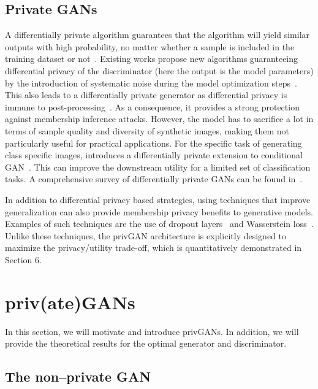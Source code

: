 \documentclass{article}
\begin{document}
\subsection{Private GANs}
A differentially private algorithm guarantees that the algorithm will yield similar outputs with high probability, no matter whether a sample is included in the training dataset or not~\cite{dwork2014algorithmic}. Existing works  \cite{xie2018differentially,jordon2018pate} propose new algorithms guaranteeing differential privacy of the discriminator (here the output is the model parameters) by the introduction of systematic noise during the model optimization steps~\cite{abadi2016deep}. This also leads to a differentially private generator as differential privacy is immune to post-processing~\cite{dwork2014algorithmic}. As a consequence, it provides a strong protection against membership inference attacks. However, the model has to sacrifice a lot in terms of sample quality and diversity of synthetic images, making them not particularly useful for practical applications. For the specific task of generating class specific images, \cite{torkzadehmahani2019dp} introduces a differentially private extension to conditional GAN~\cite{mirza2014conditional}. This can improve the downstream utility for a limited set of classification tasks. A comprehensive survey of differentially private GANs can be found in~\cite{fan2020survey}.

In addition to differential privacy based strategies, using techniques that improve generalization can also provide membership privacy benefits to generative models. Examples of such techniques are the use of dropout layers~\cite{mou2018dropout} and Wasserstein loss~\cite{arjovsky2017wasserstein}. Unlike these techniques, the privGAN architecture is explicitly designed to maximize the privacy/utility trade-off, which is quantitatively demonstrated in Section 6. 

\section{priv(ate)GANs}
In this section, we will motivate and introduce privGANs. In addition, we will provide the theoretical results for the optimal generator and discriminator.  

\subsection{The non--private GAN}
\end{document}
